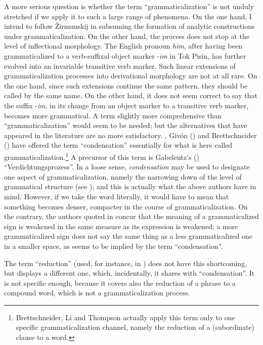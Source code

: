 A more serious question is whether the term ``grammaticalization'' is not unduly stretched if we apply it to such a large range of phenomena. On the one hand, I intend to follow Žirmunskij in subsuming the formation of analytic constructions under grammaticalization. On the other hand, the process does not stop at the level of inflectional morphology. The English pronoun \textit{him}, after having been grammaticalized to a verb-suffixal object marker -\textit{im} in Tok Pisin, has further evolved into an invariable transitive verb marker. Such linear extensions of grammaticalization processes into derivational morphology are not at all rare. On the one hand, since such extensions continue the same pattern, they should be called by the same name. On the other hand, it does not seem correct to say that the suffix -\textit{im}, in its change from an object marker to a transitive verb marker, becomes more grammatical. A term slightly more comprehensive than ``grammaticalization'' would seem to be needed; but the alternatives that have appeared in the literature are no more satisfactory.\label{page12} \citet{LiEtAL1974}, Givón (\citeyear[209]{Givón1979b}) and Brettschneider (\citeyear[94]{BrettschneiderEtAl1980}) 
have offered the term ``condensation'' essentially for what is here called grammaticalization.\footnote{Brettschneider, Li and Thompson actually apply this term only to one specific grammaticalization channel, namely the reduction of a (subordinate) clause to a word.} A precursor of this term is Gabelentz's (\citeyear[433, 436]{Gabelentz1891}) ``Verdichtungsprozess''. In a loose sense, \textit{condensation} may be used to designate one aspect of grammaticalization, namely the narrowing down of the level of grammatical structure (see ); and this is actually what the above authors have in mind.\label{page12b} However, if we take the word literally, it would have to mean that something becomes denser, compacter in the course of grammaticalization. On the contrary, the authors quoted in  concur that the meaning of a grammaticalized sign is weakened in the same measure as its expression is weakened; a more grammaticalized sign does not say the same thing as a less grammaticalized one in a smaller space, as seems to be implied by the term ``condensation''.

The term ``reduction'' (used, for instance, in \citealt[103--107]{Langacker1977}) does not have this shortcoming, but displays a different one, which, incidentally, it shares with ``condensation''. It is not specific enough, because it covers also the reduction of a phrase to a compound word, which is not a grammaticalization process.

